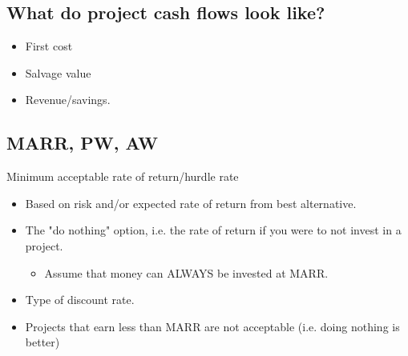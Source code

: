 \subsection{What do project cash flows look like?}
\begin{intuition}
    \begin{itemize}
        \item First cost
        \item Salvage value 
        \item Revenue/savings.
    \end{itemize}
\end{intuition}

\subsection{MARR, PW, AW}
\begin{terminology}
    Minimum acceptable rate of return/hurdle rate
        \begin{itemize}
            \item Based on risk and/or expected rate of return from best alternative.
            \item The "do nothing" option, i.e. the rate of return if you were to not invest in a project.
            \begin{itemize}
                \item Assume that money can ALWAYS be invested at MARR.
            \end{itemize}
            \item Type of discount rate.
            \item Projects that earn less than MARR are not acceptable (i.e. doing nothing is better)
        \end{itemize}          
\end{terminology}

